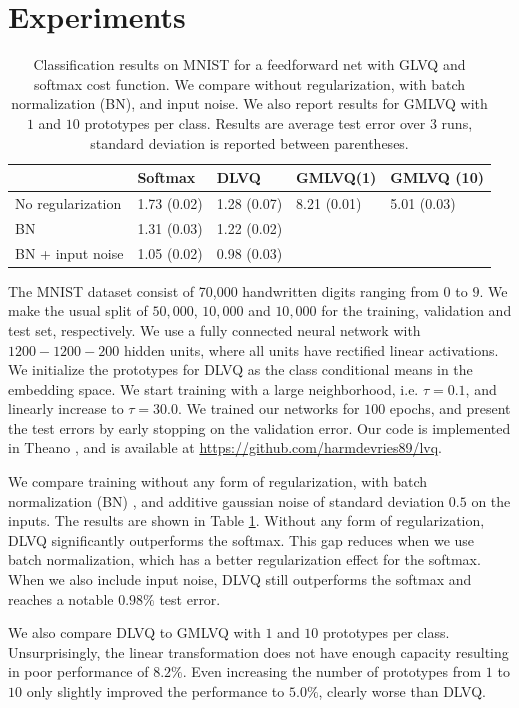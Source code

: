 \documentclass{esannV2}
\begin{document}
\section{Experiments}
\begin{table}
\caption{Classification results on MNIST for a feedforward net with GLVQ and softmax cost function. We compare without regularization, with batch normalization (BN), and input noise. We also report results for GMLVQ with $1$ and $10$ prototypes per class. Results are average test error over 3 runs, standard deviation is reported between parentheses. }
\label{table:results}
 \begin{tabular}{l||llll}
  & Softmax & DLVQ & GMLVQ(1) & GMLVQ (10)\\
 \hline
 No regularization & 1.73 (0.02) & 1.28 (0.07) & 8.21 (0.01) & 5.01 (0.03)\\
 BN & 1.31 (0.03) & 1.22 (0.02)& &\\
 BN + input noise & 1.05 (0.02) & 0.98 (0.03)&&
 \end{tabular}
\end{table}
The MNIST dataset consist of 70,000 handwritten digits ranging from $0$ to $9$. We make the usual split of $50,000$, $10,000$ and $10,000$ for the training, validation and test set, respectively. We use a fully connected neural network with $1200-1200-200$ hidden units, where all units have rectified linear activations. We initialize the prototypes for DLVQ as the class conditional means in the embedding space. We start training with a large neighborhood, i.e. $\tau=0.1$, and linearly increase to $\tau=30.0$. 
We trained our networks for $100$ epochs, and present the test errors by early stopping on the validation error.  
Our code is implemented in Theano \cite{Bastien-Theano-2012}, and is available at \url{https://github.com/harmdevries89/lvq}. 


We compare training without any form of regularization, with batch normalization (BN) \cite{DBLP:journals/corr/IoffeS15}, and additive gaussian noise of standard deviation $0.5$ on the inputs. The results are shown in Table \ref{table:results}. Without any form of regularization, DLVQ significantly outperforms the softmax. This gap reduces when we use batch normalization, which has a better regularization effect for the softmax. When we also include input noise, DLVQ still outperforms the softmax and reaches a notable $0.98\%$ test error. 

We also compare DLVQ to GMLVQ with $1$ and $10$ prototypes per class. Unsurprisingly, the linear transformation does not have enough capacity resulting in poor performance of $8.2\%$. Even increasing the number of prototypes from $1$ to $10$ only slightly improved the performance to $5.0\%$, clearly worse than DLVQ. 
\end{document}
